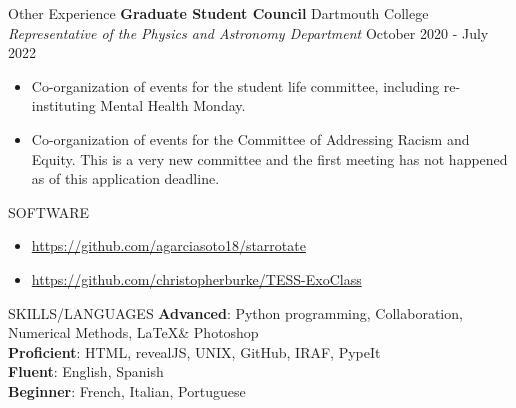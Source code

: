 \documentclass{resume} %
\begin{document}
\begin{rSection}{Other Experience}
{\bf Graduate Student Council} \hfill{Dartmouth College} \\
{\sl Representative of the Physics and Astronomy Department}
\hfill October 2020 - July 2022
\begin{itemize} \itemsep -5pt
\item Co-organization of events for the student life committee, including re-instituting Mental Health Monday.
\item Co-organization of events for the Committee of Addressing Racism and Equity. This is a very new committee and the first meeting has not happened as of this application deadline.
\end{itemize}
\end{rSection}
\begin{rSection}{SOFTWARE}
\begin{itemize}
\item\url{https://github.com/agarciasoto18/starrotate}
\item \url{https://github.com/christopherburke/TESS-ExoClass}
\end{itemize}

\end{rSection}
\begin{rSection}{SKILLS/LANGUAGES}
\textbf{Advanced}: Python programming, Collaboration, Numerical Methods, \LaTeX \& Photoshop \\
\textbf{Proficient}:  HTML, revealJS, UNIX, GitHub, IRAF, PypeIt \\ 
\textbf{Fluent}: English, Spanish \\
\textbf{Beginner}: French, Italian, Portuguese
\end{rSection}
\end{document}
